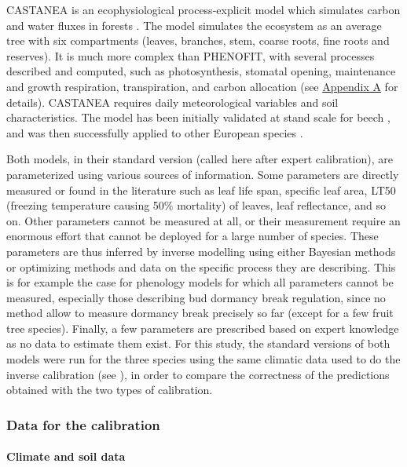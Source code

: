 CASTANEA is an ecophysiological process-explicit model which simulates
carbon and water fluxes in forests
\citep{Dufrene2005}. The
model simulates the ecosystem as an average tree with six compartments
(leaves, branches, stem, coarse roots, fine roots and reserves). It is
much more complex than PHENOFIT, with several processes described and
computed, such as photosynthesis, stomatal opening, maintenance and
growth respiration, transpiration, and carbon allocation (see
\hyperref[chap1:appendixA]{Appendix A} for details). CASTANEA
requires daily meteorological variables and soil characteristics. The
model has been initially validated at stand scale for beech
\citep{Davi2005}, and was
then successfully applied to other European species \citep[e.g.][]{Davi2006, Delpierre2012, Davi2017}.

Both models, in their standard version (called here after expert
calibration), are parameterized using various sources of information.
Some parameters are directly measured or found in the literature such as
leaf life span, specific leaf area, LT50 (freezing temperature causing
50\% mortality) of leaves, leaf reflectance, and so on. Other parameters
cannot be measured at all, or their measurement require an enormous
effort that cannot be deployed for a large number of species. These
parameters are thus inferred by inverse modelling using either Bayesian
methods or optimizing methods and data on the specific process they are
describing. This is for example the case for phenology models for which
all parameters cannot be measured, especially those describing bud
dormancy break regulation, since no method allow to measure dormancy
break precisely so far (except for a few fruit tree species). Finally, a
few parameters are prescribed based on expert knowledge as no data to
estimate them exist. For this study, the standard versions of both
models were run for the three species using the same climatic data used
to do the inverse calibration (see ), in order to
compare the correctness of the predictions obtained with the two types
of calibration.



\hypertarget{data}{%
\subsubsection{Data for the calibration}\label{data}}

\paragraph{Climate and soil data}
\label{sec:climatedata}


